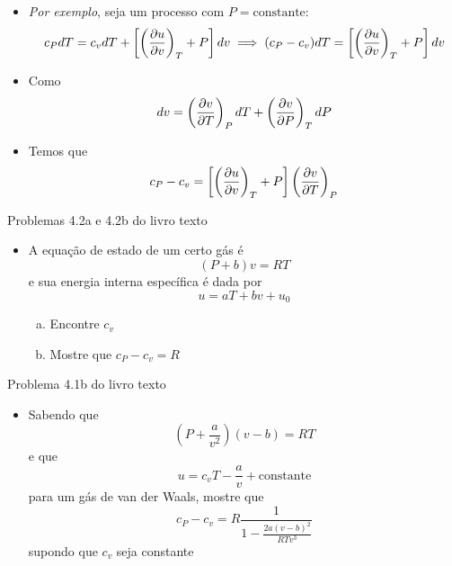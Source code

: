 \documentclass[t,%
brazilian,%
11pt,%
aspectratio=169,%
table%
]{beamer}
\begin{document}
\begin{frame}
    \begin{itemize}
        \item \textit{Por exemplo}, seja um processo com \(P=\text{constante}\):
            \[
                c_P dT = c_v dT + \left[ \left(\frac{\partial u}{\partial v}\right)_T + P\right] dv \implies (c_P-c_v) dT = \left[ \left(\frac{\partial u}{\partial v}\right)_T + P\right] dv
            \]
        \item Como
            \[
                dv = \left(\frac{\partial v}{\partial T}\right)_P dT + \left(\frac{\partial v}{\partial P}\right)_T dP
            \]
        \item Temos que
            \[
                c_P-c_v = \left[ \left(\frac{\partial u}{\partial v}\right)_T + P\right] \left(\frac{\partial v}{\partial T}\right)_P
            \]

    \end{itemize}
\end{frame}

\begin{frame}{Problemas 4.2a e 4.2b  do livro texto}
    \begin{itemize}
        \item A equação de estado de um certo gás é 
            \[
                (P+b)v = RT
            \]
            e sua energia interna específica é dada por 
            \[
                u=aT+bv+u_0
            \]
            \begin{enumerate}[(a)]
                \item Encontre \(c_v\)
                \item Mostre que \(c_P -c_v = R\)
            \end{enumerate}
    \end{itemize}
\end{frame}

\begin{frame}{Problema 4.1b do livro texto}
    \begin{itemize}
        \item Sabendo que 
            \[
                \left(P+\frac{a}{v^2}\right)(v-b)=RT
            \]
            e que
            \[
                u = c_v T - \frac{a}{v} + \text{constante}
            \]
            para um gás de van der Waals, mostre que 
            \[
                c_P -c_v = R\frac{1}{1-\frac{2a(v-b)^2}{RTv^3}}
            \]
            supondo que \(c_v\) seja constante
    \end{itemize}
\end{frame}
\end{document}
